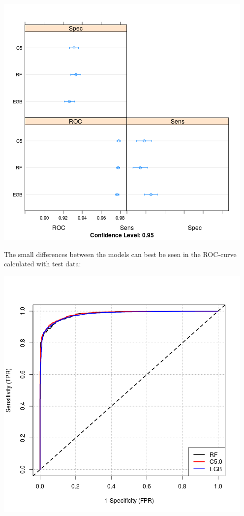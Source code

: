 \documentclass[12pt,a4paper,leqno]{report}
\theoremstyle{plain}
\theoremstyle{definition}
\theoremstyle{remark}
\begin{document}
\bigskip
{
    \centering
    \includegraphics[width=\textwidth,height=\textheight,keepaspectratio]{dotplot_comparison.png}
    \par
}
\bigskip

The small differences between the models can best be seen in the ROC-curve calculated with test data:

\bigskip
{
    \centering
    \includegraphics[width=\textwidth,height=\textheight,keepaspectratio]{AUC_comparison.png}
    \par
}
\bigskip
\end{document}
